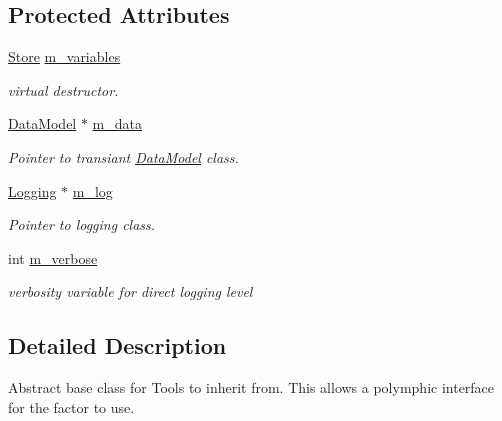 \subsection*{Protected Attributes}
\begin{DoxyCompactItemize}
\item 
\hyperlink{classStore}{Store} \hyperlink{classTool_a208aed50c1c50212d2927b372c38763f}{m\-\_\-variables}
\begin{DoxyCompactList}\small\item\em virtual destructor. \end{DoxyCompactList}\item 
\hypertarget{classTool_a98d3ffa12f1de908da9030c8718ce3f5}{\hyperlink{classDataModel}{Data\-Model} $\ast$ \hyperlink{classTool_a98d3ffa12f1de908da9030c8718ce3f5}{m\-\_\-data}}\label{classTool_a98d3ffa12f1de908da9030c8718ce3f5}

\begin{DoxyCompactList}\small\item\em Pointer to transiant \hyperlink{classDataModel}{Data\-Model} class. \end{DoxyCompactList}\item 
\hypertarget{classTool_a23a5d42347d82e51c8a965de7808cd09}{\hyperlink{classLogging}{Logging} $\ast$ \hyperlink{classTool_a23a5d42347d82e51c8a965de7808cd09}{m\-\_\-log}}\label{classTool_a23a5d42347d82e51c8a965de7808cd09}

\begin{DoxyCompactList}\small\item\em Pointer to logging class. \end{DoxyCompactList}\item 
\hypertarget{classTool_a49dc4701c181ce95f8ca4699d82f34e5}{int \hyperlink{classTool_a49dc4701c181ce95f8ca4699d82f34e5}{m\-\_\-verbose}}\label{classTool_a49dc4701c181ce95f8ca4699d82f34e5}

\begin{DoxyCompactList}\small\item\em verbosity variable for direct logging level \end{DoxyCompactList}\end{DoxyCompactItemize}


\subsection{Detailed Description}
Abstract base class for Tools to inherit from. This allows a polymphic interface for the factor to use.

